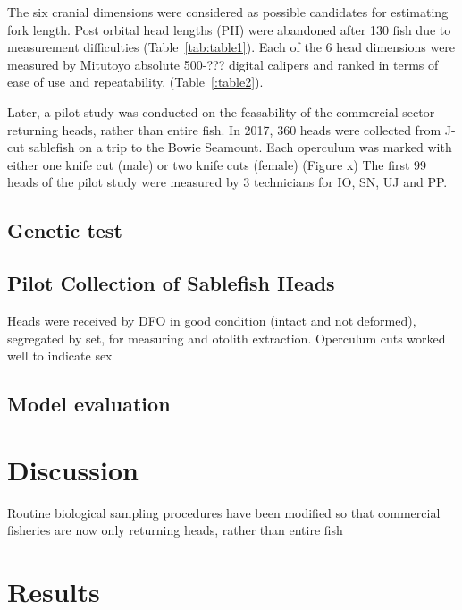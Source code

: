 \documentclass[12pt]{article}\usepackage[]{graphicx}\usepackage[]{color}
\begin{document}
The six cranial dimensions were considered as possible candidates for estimating fork length. Post orbital head lengths (PH) were abandoned after 130 fish due to measurement difficulties (Table~\ref{tab:table1}). Each of the 6 head dimensions were measured by Mitutoyo absolute 500-??? digital calipers and ranked in terms of ease of use and repeatability. (Table~\ref{:table2}).

Later, a pilot study was conducted on the feasability of the commercial sector returning heads, rather than entire fish. In 2017, 360 heads were collected from J-cut sablefish on a trip to the Bowie Seamount. Each operculum was marked with either one knife cut (male) or two knife cuts (female) (Figure x) The first 99 heads of the pilot study were measured by 3 technicians for IO, SN, UJ and PP.

\hypertarget{genetic-test}{%
\subsection{Genetic test}\label{genetic-test}}

\hypertarget{pilot-collection-of-sablefish-heads}{%
\subsection{Pilot Collection of Sablefish Heads}\label{pilot-collection-of-sablefish-heads}}

Heads were received by DFO in good condition (intact and not deformed), segregated by set, for measuring and otolith extraction. Operculum cuts worked well to indicate sex

\hypertarget{model-evaluation}{%
\subsection{Model evaluation}\label{model-evaluation}}

\hypertarget{discussion}{%
\section{Discussion}\label{discussion}}

Routine biological sampling procedures have been modified so that commercial fisheries are now only returning heads, rather than entire fish

\clearpage

\hypertarget{results}{%
\section{Results}\label{results}}
\end{document}
